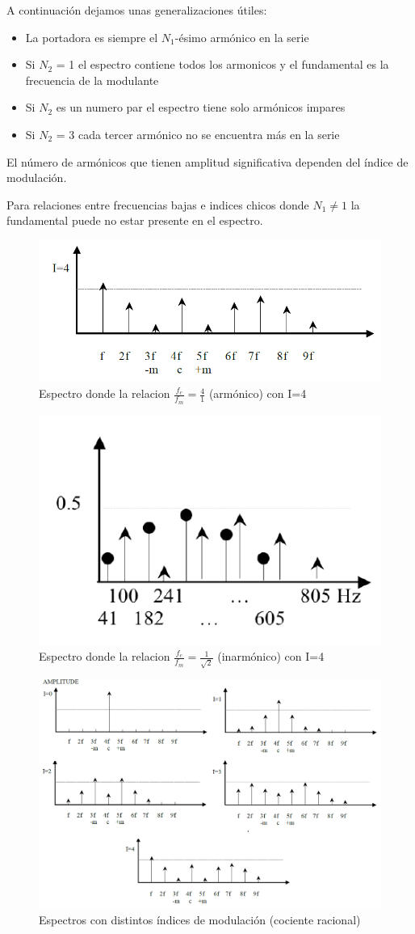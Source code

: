 \documentclass[assd_tp2_main.tex]{subfiles}
\begin{document}
{A continuación dejamos unas generalizaciones útiles:
\begin{itemize}
\item La portadora es siempre el $N_1$-ésimo armónico  en la serie
\item Si $N_2$ = 1 el espectro contiene todos los armonicos	y el fundamental es la frecuencia de la modulante
\item Si $N_2$ es un numero par el espectro tiene solo armónicos impares
\item Si $N_2$ = 3 cada tercer armónico no se encuentra más en la serie
\end{itemize}
 

El número de armónicos que tienen amplitud significativa  dependen del índice de modulación.

Para relaciones entre frecuencias bajas e indices chicos donde $N_1\neq1$ la fundamental puede no estar presente en el espectro.

\begin{figure}[H]
\centering
\includegraphics[width=0.5\linewidth]{graficos/EJ4/espectroharmonico.png}
\caption{Espectro donde la relacion $\displaystyle \frac{f_c}{f_m}=\frac{4}{1}$ (armónico) con I=4 }
\label{fig:harmonico}
\end{figure}

\begin{figure}[H]
\centering
\includegraphics[width=0.3\linewidth]{graficos/EJ4/espectroinharmonico.png}
\caption{Espectro donde la relacion $\displaystyle \frac{f_c}{f_m}=\frac{1}{\sqrt{2}}$ (inarmónico) con I=4}
\label{fig:inharmonico}
\end{figure}

\begin{figure}[H]
\centering
\includegraphics[width=0.8\linewidth]{graficos/EJ4/chowning.png}
\caption{Espectros con distintos índices de modulación (cociente racional)}
\label{fig:chowning}
\end{figure}


}
\end{document}
